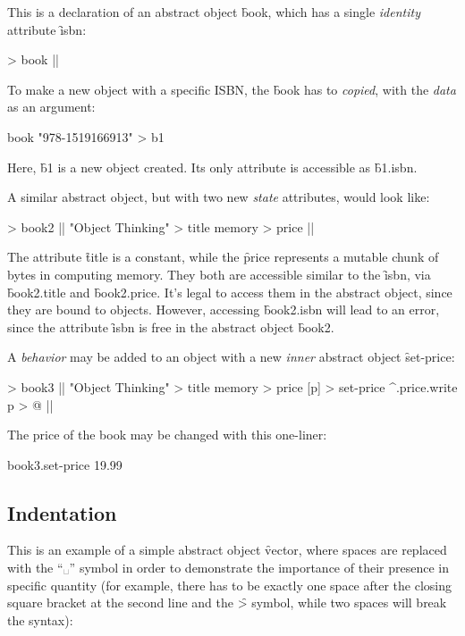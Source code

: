 This is a declaration of an abstract object \f{book},
which has a single \emph{identity} attribute \f{isbn}:

\begin{eocode}
[isbn] > book |$\label{ln:book}$|
\end{eocode}

To make a new object with a specific ISBN, the \f{book}
has to \emph{copied}, with the \emph{data} as an argument:

\begin{eocode}
book "978-1519166913" > b1
\end{eocode}

Here, \f{b1} is a new object created.
Its only attribute is accessible as \f{b1.isbn}.

A similar abstract object, but with two new \emph{state} attributes, would
look like:

\begin{eocode}
[isbn] > book2  |$\label{ln:book2}$|
  "Object Thinking" > title
  memory > price |$\label{ln:book2-end}$|
\end{eocode}

The attribute \f{title} is a constant, while the \f{price}
represents a mutable chunk of bytes in computing memory. They both are
accessible similar to the \f{isbn}, via \f{book2.title}
and \f{book2.price}. It's legal to access them in the abstract
object, since they are bound to objects. However, accessing \f{book2.isbn}
will lead to an error, since the attribute \f{isbn} is free
in the abstract object \f{book2}.

A \emph{behavior} may be added to an object with a new \emph{inner}
abstract object \f{set-price}:

\begin{eocode}
[isbn] > book3 |$\label{ln:book3}$|
  "Object Thinking" > title
  memory > price
  [p] > set-price
    ^.price.write p > @ |$\label{ln:book3-end}$|
\end{eocode}

The price of the book may be changed with this one-liner:

\begin{eocode}
book3.set-price 19.99
\end{eocode}

\subsection{Indentation}

This is an example of a simple abstract object \f{vector}, where
spaces are replaced with the ``␣'' symbol in order to demonstrate
the importance of their presence in specific quantity
(for example, there has to be exactly one space after the closing square bracket at the
second line and the \f{>} symbol, while two spaces will break the syntax):

